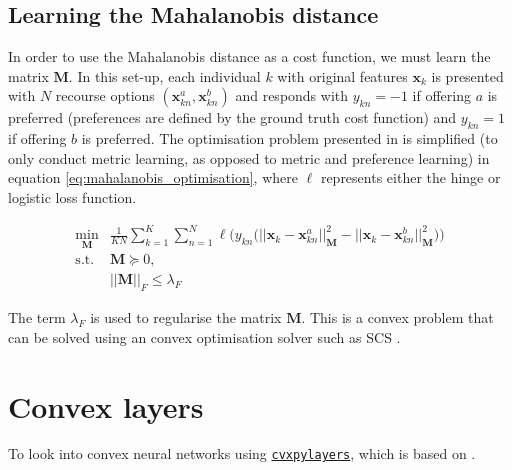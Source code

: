 \subsection{Learning the Mahalanobis distance}

In order to use the Mahalanobis distance as a cost function, we must learn the matrix $\mathbf{M}$. In this set-up, each individual $k$ with original features $\mathbf{x}_k$ is presented with $N$ recourse options $(\mathbf{x}_{kn}^a, \mathbf{x}_{kn}^b)$ and responds with $y_{kn}=-1$ if offering $a$ is preferred (preferences are defined by the ground truth cost function) and $y_{kn}=1$ if offering $b$ is preferred. The optimisation problem presented in \textcite{canalOneAllSimultaneous2022} is simplified (to only conduct metric learning, as opposed to metric and preference learning) in equation \ref{eq:mahalanobis_optimisation}, where $\ell$ represents either the hinge or logistic loss function.

\begin{align} \label{eq:mahalanobis_optimisation}
	\min_{\mathbf{M}} & \frac{1}{KN} \sum_{k=1}^K \sum_{n=1}^N \ell \bigg( y_{kn} \big(|| \mathbf{x}_k - \mathbf{x}_{kn}^a ||^2_{\mathbf{M}} - || \mathbf{x}_k - \mathbf{x}_{kn}^b ||^2_{\mathbf{M}} \big) \bigg) \\	
	\text{s.t. } & \mathbf{M} \succeq 0, \nonumber \\
	& ||\mathbf{M}||_F \leq \lambda_F \nonumber
\end{align}

The term $\lambda_F$ is used to regularise the matrix $\mathbf{M}$. This is a convex problem that can be solved using an convex optimisation solver such as SCS \citep{odonoghueOperatorSplittingHomogeneous2021}.



\section{Convex layers}

To look into convex neural networks using \href{https://github.com/cvxgrp/cvxpylayers}{\texttt{cvxpylayers}}, which is based on \textcite{agrawalDifferentiableConvexOptimization2019}.
